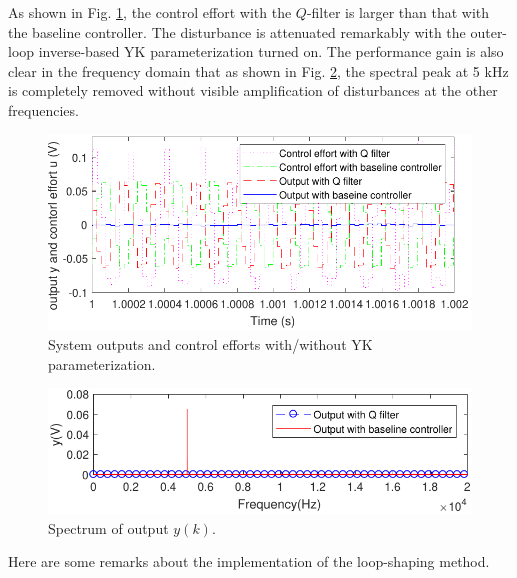 \documentclass [11pt, proquest] {uwthesis}[2020/02/24]
\begin{document}
As shown in Fig. \ref{fig:System-output-with}, the control effort
with the $Q$-filter is larger than that with the baseline controller.
The disturbance is attenuated remarkably with the outer-loop inverse-based
YK parameterization turned on. The performance gain is also clear
in the frequency domain that as shown in Fig. \ref{fig:Spectrum-of-ooutput},
the spectral peak at 5 kHz is completely removed without visible amplification
of disturbances at the other frequencies.
\begin{figure}[!ht]
\begin{centering}
\includegraphics[width=13cm]{Loop-shaping/output_Q_baseline_2}
\par\end{centering}
\caption{\label{fig:System-output-with}System outputs and control efforts
with/without YK parameterization.}
\end{figure}
\begin{figure}[!ht]
\begin{centering}
\includegraphics[width=13cm]{Loop-shaping/spectrum}
\par\end{centering}
\caption{\label{fig:Spectrum-of-ooutput}Spectrum of output $y(k)$.}
\end{figure}

Here are some remarks about the implementation of the loop-shaping method.
\end{document}
